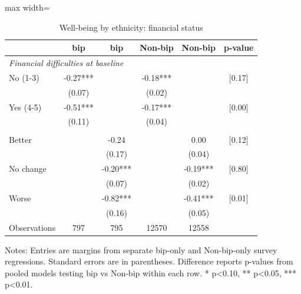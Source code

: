 \begin{table}[htbp]
\centering
\caption{Well-being by ethnicity: financial status}
\small
\begin{adjustbox}{max width=\textwidth}
\begin{tabular}{p{5.2cm}ccccc}
\toprule
& bip & bip & Non-bip & Non-bip & p-value \\
\midrule
\multicolumn{6}{l}{\textit{Financial difficulties at baseline}} \\
No (1-3) & -0.27*** &  & -0.18*** &  & [0.17] \\
& (0.07) &  & (0.02) &  & \\
Yes (4-5) & -0.51*** &  & -0.17*** &  & [0.00] \\
& (0.11) &  & (0.04) &  & \\
\addlinespace
\multicolumn{6}{l}{\textit{Change in financial status}} \\
Better &  & -0.24 &  & 0.00 & [0.12] \\
&  & (0.17) &  & (0.04) & \\
No change &  & -0.20*** &  & -0.19*** & [0.80] \\
&  & (0.07) &  & (0.02) & \\
Worse &  & -0.82*** &  & -0.41*** & [0.01] \\
&  & (0.16) &  & (0.05) & \\
\midrule
Observations & 797 & 795 & 12570 & 12558 & \\
\bottomrule
\end{tabular}
\end{adjustbox}

\begin{flushleft}
\footnotesize Notes: Entries are margins from separate bip-only and Non-bip-only survey regressions. Standard errors are in parentheses. Difference reports p-values from pooled models testing bip vs Non-bip within each row. * p<0.10, ** p<0.05, *** p<0.01.
\end{flushleft}
\end{table}